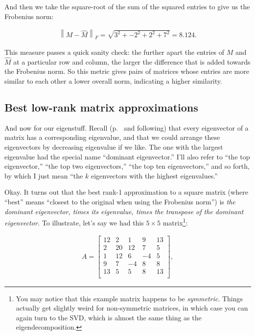 \begin{alttitles}
And then we take the square-root of the sum of the squared entries to give us
the Frobenius norm:

\vspace{-.15in}
\begin{align*}
{\left\lVert{M - \hat{M}}\right\rVert_F} =
\sqrt{3^2 + -2^2 + 2^2 + 7^2} = 8.124.
\end{align*}
\vspace{-.15in}

This measure passes a quick sanity check: the further apart the entries of $M$
and $\hat{M}$ at a particular row and column, the larger the difference that is
added towards the Frobenius norm. So this metric gives pairs of matrices whose
entries are more similar to each other a lower overall norm, indicating a
higher similarity.

\subsection{Best low-rank matrix approximations}


And now for our eigenstuff. Recall (p.~\pageref{theScoopAboutEigenvectors} and
following) that every eigenvector of a matrix has a corresponding eigenvalue,
and that we could arrange these eigenvectors by decreasing eigenvalue if we
like. The one with the largest eigenvalue had the special name ``dominant
eigenvector.'' I'll also refer to ``the top eigenvector,'' ``the top two
eigenvectors,'' ``the top ten eigenvectors,'' and so forth, by which I just
mean ``the $k$ eigenvectors with the highest eigenvalues.''

Okay. It turns out that the best rank-1 approximation to a square matrix (where
``best'' means ``closest to the original when using the Frobenius norm'') is
\textit{the dominant eigenvector, times its eigenvalue, times the transpose of
the dominant eigenvector.} To illustrate, let's say we had this $5\times 5$
matrix\footnote{You may notice that this example matrix happens to be
\textit{symmetric}. Things actually get slightly weird for non-symmetric
matrices, in which case you can again turn to the SVD, which is almost the same thing as the
 eigendecomposition.}:

\vspace{-.15in}
\label{Amatrix}
\begin{align*}
A =
\begin{bmatrix}
12 & 2 & 1 & 9 & 13 \\
2 & 20 & 12 & 7 & 5 \\
1 & 12 & 6 & -4 & 5 \\
9 & 7 & -4 & 8 & 8 \\
13 & 5 & 5 & 8 & 13 \\
\end{bmatrix}
,
\end{align*}
\vspace{-.15in}


\end{alttitles}

